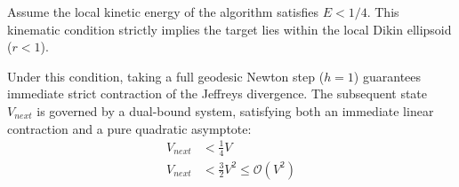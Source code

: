 \begin{theorem}
\label{thm:pure_quadratic}
Assume the local kinetic energy of the algorithm satisfies $E < 1/4$. This kinematic condition strictly implies the target lies within the local Dikin ellipsoid ($r < 1$). 

Under this condition, taking a full geodesic Newton step ($h=1$) guarantees immediate strict contraction of the Jeffreys divergence. The subsequent state $V_{next}$ is governed by a dual-bound system, satisfying both an immediate linear contraction and a pure quadratic asymptote:
\begin{align}
    V_{next} &< \frac{1}{4} V \\
    V_{next} &< \frac{3}{2} V^2 \le \mathcal{O}(V^2)
\end{align}
\end{theorem}

